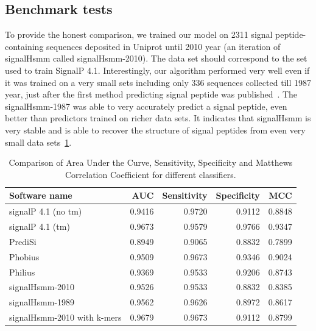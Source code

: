 \documentclass[fleqn,10pt,twoside]{gcb15submission}
\begin{document}
\subsection*{Benchmark tests}

To provide the honest comparison, we trained our model on 2311 signal peptide-containing sequences deposited in Uniprot until 2010 year (an iteration of signalHsmm called signalHsmm-2010). The data set should correspond to the set used to train SignalP 4.1. Interestingly, our algorithm performed very well even if it was trained on a very small sets including only 336 sequences collected till 1987 year, just after the first method predicting signal peptide was published~\citep{1986vonheijnea}. The signalHsmm-1987 was able to very accurately predict a signal peptide, even better than predictors trained on richer data sets. It indicates that signalHsmm is very stable and is able to recover the structure of signal peptides from even very small data sets~\ref{tab:bench2010}.

\begin{table}[ht]
\small
\centering
\caption{Comparison of Area Under the Curve, Sensitivity, Specificity and Matthews Correlation Coefficient for different classifiers.} 
\begin{tabular}{lrrrr}
  \toprule
Software name & AUC & Sensitivity & Specificity & MCC \\ 
  \midrule
signalP 4.1 (no tm) \citep{2011petersensignalp} & 0.9416 & 0.9720 & 0.9112 & 0.8848 \\ 
   \rowcolor[gray]{0.85}signalP 4.1 (tm) \citep{2011petersensignalp} & 0.9673 & 0.9579 & 0.9766 & 0.9347 \\ 
  PrediSi \citep{2004hillerpredisi} & 0.8949 & 0.9065 & 0.8832 & 0.7899 \\ 
   \rowcolor[gray]{0.85}Phobius \citep{2004klla} & 0.9509 & 0.9673 & 0.9346 & 0.9024 \\ 
  Philius \citep{2008reynoldstransmembrane} & 0.9369 & 0.9533 & 0.9206 & 0.8743 \\ 
   \rowcolor[gray]{0.85}signalHsmm-2010 & 0.9526 & 0.9533 & 0.8832 & 0.8385 \\ 
  signalHsmm-1989 & 0.9562 & 0.9626 & 0.8972 & 0.8617 \\ 
   \rowcolor[gray]{0.85}signalHsmm-2010 with k-mers & 0.9679 & 0.9673 & 0.9112 & 0.8799 \\ 
   \bottomrule
\end{tabular}
\label{tab:bench2010}
\end{table}
\end{document}
